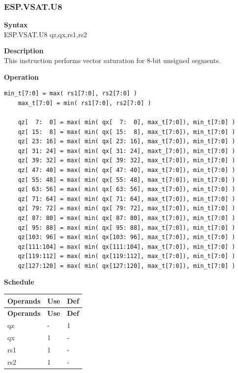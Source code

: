 \newpage
\subsubsection{ESP.VSAT.U8}\label{instruction:ESPVSATU8}
\textbf{Syntax}\\
ESP.VSAT.U8 qz,qx,rs1,rs2

\textbf{Description}\\
This instruction performs vector saturation for 8-bit unsigned segments.

\textbf{Operation}\\
\begin{lstlisting}[escapeinside=`?]
    min_t[7:0] = max( rs1[7:0], rs2[7:0] )
    max_t[7:0] = min( rs1[7:0], rs2[7:0] )

    qz[  7:  0] = max( min( qx[  7:  0], max_t[7:0]), min_t[7:0] )
    qz[ 15:  8] = max( min( qx[ 15:  8], max_t[7:0]), min_t[7:0] )
    qz[ 23: 16] = max( min( qx[ 23: 16], max_t[7:0]), min_t[7:0] )
    qz[ 31: 24] = max( min( qx[ 31: 24], maxt_[7:0]), min_t[7:0] )
    qz[ 39: 32] = max( min( qx[ 39: 32], max_t[7:0]), min_t[7:0] )
    qz[ 47: 40] = max( min( qx[ 47: 40], max_t[7:0]), min_t[7:0] )
    qz[ 55: 48] = max( min( qx[ 55: 48], max_t[7:0]), min_t[7:0] )
    qz[ 63: 56] = max( min( qx[ 63: 56], max_t[7:0]), min_t[7:0] )
    qz[ 71: 64] = max( min( qx[ 71: 64], max_t[7:0]), min_t[7:0] )
    qz[ 79: 72] = max( min( qx[ 79: 72], max_t[7:0]), min_t[7:0] )
    qz[ 87: 80] = max( min( qx[ 87: 80], max_t[7:0]), min_t[7:0] )
    qz[ 95: 88] = max( min( qx[ 95: 88], max_t[7:0]), min_t[7:0] )
    qz[103: 96] = max( min( qx[103: 96], max_t[7:0]), min_t[7:0] )
    qz[111:104] = max( min( qx[111:104], max_t[7:0]), min_t[7:0] )
    qz[119:112] = max( min( qx[119:112], max_t[7:0]), min_t[7:0] )
    qz[127:120] = max( min( qx[127:120], max_t[7:0]), min_t[7:0] )
\end{lstlisting}


\textbf{Schedule}\\
\begin{longtable}[c]{|l|l|l|}
    \hline
    \rowcolor{lightgray}
    \textbf{Operands} & \textbf{Use} & \textbf{Def} \\\hline
    \endfirsthead
    \hline
    \rowcolor{lightgray}
     \textbf{Operands} & \textbf{Use} & \textbf{Def} \\\hline
    \endhead
    \hline
    \endfoot

  qz & - & 1 \\\hline
    qx & 1 & - \\\hline
    rs1 & 1 & - \\\hline
    rs2 & 1 & -

\end{longtable}

